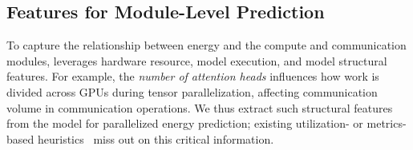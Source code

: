 



\subsection{Features for Module-Level Prediction}
\label{ss:design-features}

To capture the relationship between energy and the compute and communication modules, \sys{} leverages hardware resource, model execution, and model structural features.
For example, the \emph{number of attention heads} influences how work is divided across GPUs during tensor parallelization, affecting communication volume in communication operations.
We thus extract such structural features from the model for parallelized energy prediction; existing utilization- or metrics-based heuristics~\cite{strubell19,Nguyen-hotcarbon,wilkins2024offlineenergyoptimalllmserving} miss out on this critical information. 

